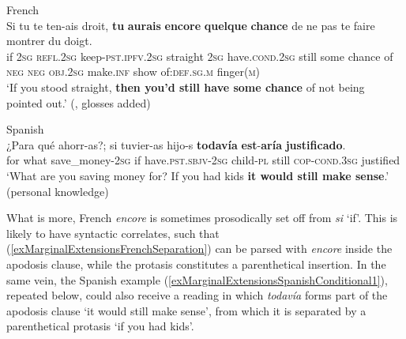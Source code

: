 \begin{exe}

	\ex French\label{exMarginalExtensionsFrenchConditional1mod}\\
\gll Si tu te ten-ais droit, \textbf{tu} \textbf{aurais} \textbf{encore} \textbf{quelque} \textbf{chance} de ne pas te faire montrer du doigt.\\
if 2\textsc{sg} \textsc{refl}.2\textsc{sg} keep-\textsc{pst}.\textsc{ipfv}.2\textsc{sg} straight 2\textsc{sg} have.\textsc{cond}.2\textsc{sg} still some chance of \textsc{neg} \textsc{neg} \textsc{obj}.2\textsc{sg} make.\textsc{inf} show of:\textsc{def}.\textsc{sg}.\textsc{m} finger(\textsc{m})\\
	\glt \lq If you stood straight, \textbf{then you'd still have some chance} of not being pointed out.' (\cite[83]{VictorriFuchs1996}, glosses added)
	
\ex Spanish\label{exMarginalExtensionsSpanishConditional1mod}\\
\gll ¿Para qué ahorr-as?; si tuvier-as hijo-s \textbf{todavía} \textbf{est}-\textbf{aría} \textbf{justificado}.\\
	\phantom{¿}for what save\_money-2\textsc{sg} if have.\textsc{pst}.\textsc{sbjv}-2\textsc{sg} child-\textsc{pl} still \textsc{cop}-\textsc{cond}.3\textsc{sg} justified\\
	\glt \lq What are you saving money for? If you had kids \textbf{it would still make sense}.' (personal knowledge)
\end{exe}

What is more, French \textit{encore} is sometimes prosodically set off from \textit{si} \lq if'. This is likely to have syntactic correlates, such that (\ref{exMarginalExtensionsFrenchSeparation}) can be parsed with \textit{encore} inside the apodosis clause, while the protasis constitutes a parenthetical insertion. In the same vein, the Spanish example (\ref{exMarginalExtensionsSpanishConditional1}), repeated below, could also receive a reading in which \textit{todavía} forms part of the apodosis clause \lq it would still make sense\rq{}, from which it is separated by a parenthetical protasis \lq if you had kids\rq{}.

